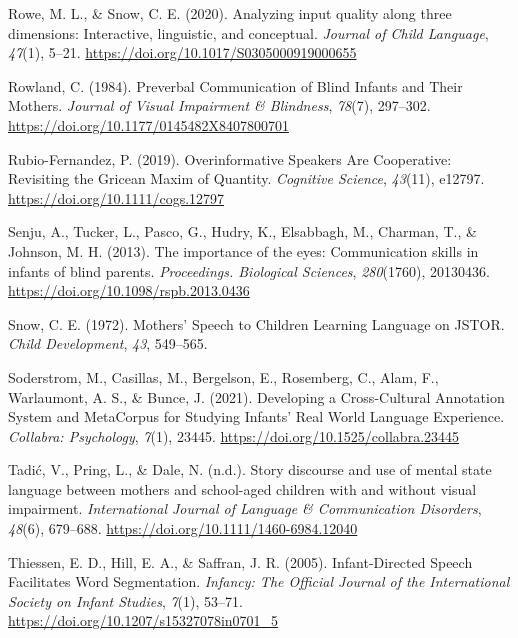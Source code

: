 \documentclass[english,man]{apa6}
\begin{document}
\leavevmode\hypertarget{ref-rowe2020}{}%
Rowe, M. L., \& Snow, C. E. (2020). Analyzing input quality along three dimensions: Interactive, linguistic, and conceptual. \emph{Journal of Child Language}, \emph{47}(1), 5--21. \url{https://doi.org/10.1017/S0305000919000655}

\leavevmode\hypertarget{ref-rowland1984}{}%
Rowland, C. (1984). Preverbal Communication of Blind Infants and Their Mothers. \emph{Journal of Visual Impairment \& Blindness}, \emph{78}(7), 297--302. \url{https://doi.org/10.1177/0145482X8407800701}

\leavevmode\hypertarget{ref-rubio-fernandez2019}{}%
Rubio-Fernandez, P. (2019). Overinformative Speakers Are Cooperative: Revisiting the Gricean Maxim of Quantity. \emph{Cognitive Science}, \emph{43}(11), e12797. \url{https://doi.org/10.1111/cogs.12797}

\leavevmode\hypertarget{ref-senju2013}{}%
Senju, A., Tucker, L., Pasco, G., Hudry, K., Elsabbagh, M., Charman, T., \& Johnson, M. H. (2013). The importance of the eyes: Communication skills in infants of blind parents. \emph{Proceedings. Biological Sciences}, \emph{280}(1760), 20130436. \url{https://doi.org/10.1098/rspb.2013.0436}

\leavevmode\hypertarget{ref-snow1972}{}%
Snow, C. E. (1972). Mothers' Speech to Children Learning Language on JSTOR. \emph{Child Development}, \emph{43}, 549--565.

\leavevmode\hypertarget{ref-soderstrom2021}{}%
Soderstrom, M., Casillas, M., Bergelson, E., Rosemberg, C., Alam, F., Warlaumont, A. S., \& Bunce, J. (2021). Developing a Cross-Cultural Annotation System and MetaCorpus for Studying Infants' Real World Language Experience. \emph{Collabra: Psychology}, \emph{7}(1), 23445. \url{https://doi.org/10.1525/collabra.23445}

\leavevmode\hypertarget{ref-tadic2013}{}%
Tadić, V., Pring, L., \& Dale, N. (n.d.). Story discourse and use of mental state language between mothers and school-aged children with and without visual impairment. \emph{International Journal of Language \& Communication Disorders}, \emph{48}(6), 679--688. \url{https://doi.org/10.1111/1460-6984.12040}

\leavevmode\hypertarget{ref-thiessen2005}{}%
Thiessen, E. D., Hill, E. A., \& Saffran, J. R. (2005). Infant-Directed Speech Facilitates Word Segmentation. \emph{Infancy: The Official Journal of the International Society on Infant Studies}, \emph{7}(1), 53--71. \url{https://doi.org/10.1207/s15327078in0701_5}
\end{document}

